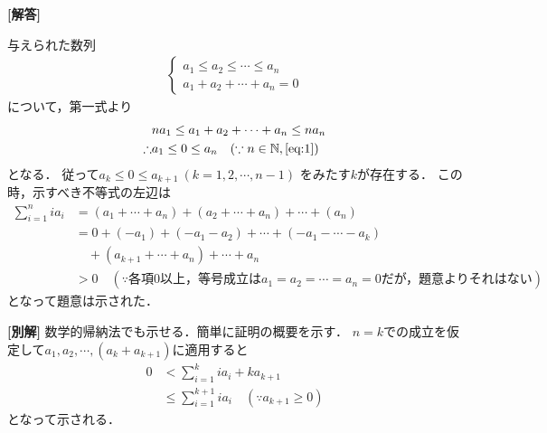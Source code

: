 \documentclass[../../main.tex]{subfiles}
\begin{document}
\begin{oframed}
  
\end{oframed}

{\bf [解答]}

与えられた数列
\begin{align}
  \begin{cases}
    a_1 \le a_2 \le \cdots \le a_n \\
    a_1 + a_2 + \cdots + a_n = 0
  \end{cases} \label{eq:1}
\end{align}
について，第一式より
\begin{align}
  & n a_1 \le a_1 + a_2 + \cdots + a_n \le n a_n \\
  \therefore
  & a_1 \le 0 \le a_n \quad (\because n \in \mathbb{N}, \text{\cref{eq:1}})
\end{align}
となる．
従って$a_k \le 0 \le a_{k+1} \ (k=1, 2, \cdots, n-1)$ をみたす$k$が存在する．
この時，示すべき不等式の左辺は
\begin{align}
  \sum_{i=1}^{n} i a_i
  &= (a_1 + \cdots + a_n) + (a_2 + \cdots + a_n) + \cdots + (a_n) \\
  &= 0 + (-a_1) + (-a_1 - a_2) + \cdots + (-a_1 - \cdots - a_k) \\
  &\quad + (a_{k+1} + \cdots + a_n) + \cdots + a_n \\
  &> 0 \quad (\because \text{各項0以上，等号成立は} a_1 = a_2 = \cdots = a_n = 0 \text{だが，題意よりそれはない})
\end{align}
となって題意は示された．

{\bf [別解]}
数学的帰納法でも示せる．簡単に証明の概要を示す．
$n=k$での成立を仮定して$a_1, a_2, \cdots, (a_k + a_{k+1})$に適用すると
\begin{align}
  0 &< \sum_{i=1}^{k} i a_i + k a_{k+1} \\
  &\le \sum_{i=1}^{k+1} i a_i \quad (\because a_{k+1} \ge 0)
\end{align}
となって示される．
\end{document}
